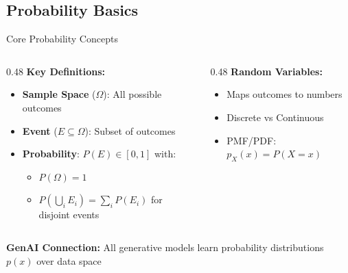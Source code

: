 \documentclass[5pt,aspectratio=169]{beamer}
\begin{document}
\subsection{Probability Basics}
\begin{frame}{Core Probability Concepts}
\begin{columns}[T]
\begin{column}{0.48\textwidth}
\textbf{Key Definitions:}
\begin{itemize}
\item \textbf{Sample Space} ($\Omega$): All possible outcomes
\item \textbf{Event} ($E \subseteq \Omega$): Subset of outcomes
\item \textbf{Probability}: $P(E) \in [0,1]$ with:
\begin{itemize}
\item $P(\Omega) = 1$
\item $P(\bigcup_i E_i) = \sum_i P(E_i)$ for disjoint events
\end{itemize}
\end{itemize}
\end{column}

\begin{column}{0.48\textwidth}
\textbf{Random Variables:}
\begin{itemize}
\item Maps outcomes to numbers
\item Discrete vs Continuous
\item PMF/PDF: $p_X(x) = P(X=x)$
\end{itemize}

\end{column}
\end{columns}

\vspace{0.5cm}
\textbf{GenAI Connection:} All generative models learn probability distributions $p(x)$ over data space
\end{frame}
\end{document}
